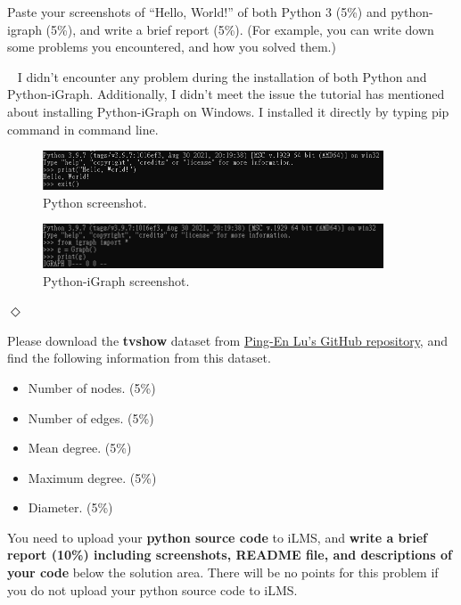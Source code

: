 \documentclass[12pt]{article}
\newcommand {\bsolution}{\noindent {\em Solution:} \ }
\newcommand{\esolution}{\hfill $\Diamond$ \\ \vspace{.3cm}}
\begin{document}
Paste your screenshots of “Hello, World!” of both Python 3 (5\%) and python-igraph (5\%), and write a brief report (5\%). (For example, you can write down some problems you encountered, and how you solved them.)

\bsolution
I didn't encounter any problem during the installation of both Python and Python-iGraph.
Additionally, I didn't meet the issue the tutorial has mentioned about installing Python-iGraph on Windows. I installed it directly by typing pip command in command line.

\begin{figure}[h]
	\centering
	\includegraphics[width=0.9\textwidth]{fig-prob5-python.png}
	\caption{Python screenshot.}
	\label{HW1_5_python}
\end{figure}
\begin{figure}[h]
	\centering
	\includegraphics[width=0.9\textwidth]{fig-prob5-igraph.png}
	\caption{Python-iGraph screenshot.}
	\label{HW1_5_igraph}
\end{figure}
\esolution
\newpage

Please download the {\bf tvshow} dataset from \href{https://github.com/PingEnLu/Network-Science-COM530500/tree/master/Network_Science_Python_iGraph_Tutorial}{Ping-En Lu's GitHub repository}, and find the following information from this dataset.

\begin{itemize}
	\item Number of nodes. (5\%)
	\item Number of edges. (5\%)
	\item Mean degree. (5\%)
	\item Maximum degree. (5\%)
	\item Diameter. (5\%)
\end{itemize}
You need to upload your {\bf python source code} to iLMS, and {\bf write a brief report (10\%) including screenshots, README file, and descriptions of your code} below the solution area. There will be no points for this problem if you do not upload your python source code to iLMS.
\end{document}
